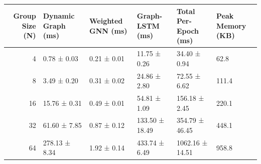 \begin{tabular}{rlllll}
\toprule
Group Size (N) & Dynamic Graph (ms) & Weighted GNN (ms) & Graph-LSTM (ms) & Total Per-Epoch (ms) & Peak Memory (KB) \\
\midrule
4 & 0.78 ± 0.03 & 0.21 ± 0.01 & 11.75 ± 0.26 & 34.40 ± 0.94 & 62.8 \\
8 & 3.49 ± 0.20 & 0.31 ± 0.02 & 24.86 ± 2.80 & 72.55 ± 6.62 & 111.4 \\
16 & 15.76 ± 0.31 & 0.49 ± 0.01 & 54.81 ± 1.09 & 156.18 ± 2.45 & 220.1 \\
32 & 61.60 ± 7.85 & 0.87 ± 0.12 & 133.50 ± 18.49 & 354.79 ± 46.45 & 448.1 \\
64 & 278.13 ± 8.34 & 1.92 ± 0.14 & 433.74 ± 6.49 & 1062.16 ± 14.51 & 958.8 \\
\bottomrule
\end{tabular}
